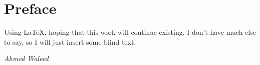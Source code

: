 \chapter*{Preface}

Using \LaTeX\xspace , hoping that this work will continue existing.
I don't have much else to say, so I will just insert some blind text. 
\blindtext

\begin{flushright}
	\textit{Ahmed Waleed}
\end{flushright}
